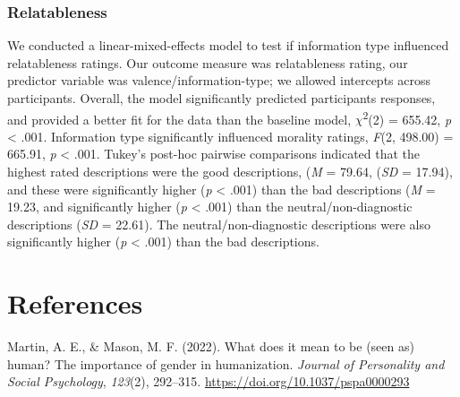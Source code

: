 \documentclass[
  man,floatsintext]{apa6}
\newlength{\cslhangindent}
\newenvironment{CSLReferences}[2] %
 {\begin{list}{}{%
  \setlength{\itemindent}{0pt}
  \setlength{\leftmargin}{0pt}
  \setlength{\parsep}{0pt}
  \ifodd #1
   \setlength{\leftmargin}{\cslhangindent}
   \setlength{\itemindent}{-1\cslhangindent}
  \fi
  \setlength{\itemsep}{#2\baselineskip}}}
 {\end{list}}
\begin{document}
\subsubsection{Relatableness}\label{relatableness}

We conducted a linear-mixed-effects model to test if information type influenced relatableness ratings. Our outcome measure was relatableness rating, our predictor variable was valence/information-type; we allowed intercepts across participants.
Overall, the model significantly predicted participants responses, and provided a better fit for the data than the baseline model,
\(\chi\)\textsuperscript{2}(2) = 655.42,
\emph{p} \textless{} .001.
Information type significantly influenced morality ratings,
\emph{F}(2,
498.00) = 665.91,
\emph{p} \textless{} .001.
Tukey's post-hoc pairwise comparisons indicated that the highest rated descriptions were the good descriptions,
(\emph{M} = 79.64,
(\emph{SD} = 17.94), and these were significantly higher
(\emph{p} \textless{} .001) than the bad descriptions
(\emph{M} = 19.23, and significantly higher
(\emph{p} \textless{} .001) than the neutral/non-diagnostic descriptions
(\emph{SD} = 22.61). The neutral/non-diagnostic descriptions were also significantly higher
(\emph{p} \textless{} .001) than the bad descriptions.

\section*{References}\label{references}

\label{refs}
\begin{CSLReferences}{1}{0}
Martin, A. E., \& Mason, M. F. (2022). What does it mean to be (seen as) human? {The} importance of gender in humanization. \emph{Journal of Personality and Social Psychology}, \emph{123}(2), 292--315. \url{https://doi.org/10.1037/pspa0000293}

\end{CSLReferences}
\end{document}
